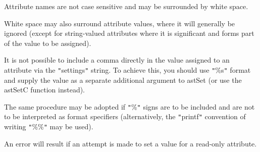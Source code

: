 \documentclass[twoside,11pt]{article}
\begin{document}
{{{         \sstitem
         Attribute names are not case sensitive and may be surrounded
         by white space.

         \sstitem
         White space may also surround attribute values, where it will
         generally be ignored (except for string-valued attributes where
         it is significant and forms part of the value to be assigned).

         \sstitem
         It is not possible to include a comma directly in the value
         assigned to an attribute via the {\tt{"}}settings{\tt{"}} string. To achieve
         this, you should use {\tt{"}}\%s{\tt{"}} format and supply the value as a
         separate additional argument to astSet (or use the astSetC
         function instead).

         \sstitem
         The same procedure may be adopted if {\tt{"}}\%{\tt{"}} signs are to be included
         and are not to be interpreted as format specifiers (alternatively,
         the {\tt{"}}printf{\tt{"}} convention of writing {\tt{"}}\%\%{\tt{"}} may be used).

         \sstitem
         An error will result if an attempt is made to set a value for
         a read-only attribute.
      }
   }
}
\end{document}
